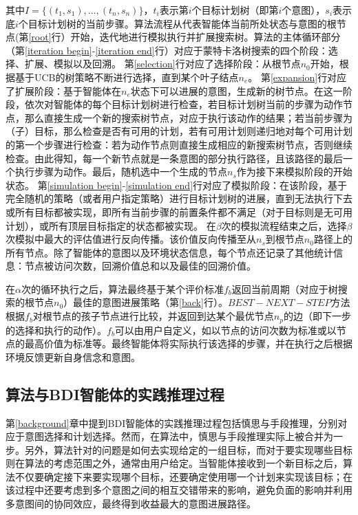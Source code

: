 其中$I=\{(t_1,s_1), \dots, (t_n, s_n)\}$，$t_i$表示第$i$个目标计划树（即第$i$个意图），$s_i$表示底$i$个目标计划树的当前步骤。算法流程从代表智能体当前所处状态与意图的根节点(第\ref{root}行）开始，迭代地进行模拟执行并扩展搜索树。算法的主体循环部分（第\ref{iteration begin}-\ref{iteration end}行）对应于蒙特卡洛树搜索的四个阶段：选择、扩展、模拟以及回溯。
第\ref{selection}行对应了选择阶段：从根节点$n_0$开始，根据基于UCB的树策略不断进行选择，直到某个叶子结点$n_e$。
第\ref{expansion}行对应了扩展阶段：基于智能体在$n_e$状态下可以进展的意图，生成新的树节点。在这一阶段，依次对智能体的每个目标计划树进行检查，若目标计划树当前的步骤为动作节点，那么直接生成一个新的搜索树节点，对应于执行该动作的结果；若当前步骤为（子）目标，那么检查是否有可用的计划，若有可用计划则递归地对每个可用计划的第一个步骤进行检查：若为动作节点则直接生成相应的新搜索树节点，否则继续检查。由此得知，每一个新节点就是一条意图的部分执行路径，且该路径的最后一个执行步骤为动作。最后，随机选中一个生成的节点$n_s$作为接下来模拟阶段的开始状态。
第\ref{simulation begin}-\ref{simulation end}行对应了模拟阶段：在该阶段，基于完全随机的策略（或者用户指定策略）进行目标计划树的进展，直到无法执行下去或所有目标都被实现，即所有当前步骤的前置条件都不满足（对于目标则是无可用计划），或所有顶层目标指定的状态都被实现。
在$\beta$次的模拟流程结束之后，选择$\beta$次模拟中最大的评估值进行反向传播。该价值反向传播至从$n_s$到根节点$n_0$路径上的所有节点。除了智能体的意图以及环境状态信息，每个节点还记录了其他统计信息：节点被访问次数，回溯价值总和以及最佳的回溯价值。

在$\alpha$次的循环执行之后，\SA 算法最终基于某个评价标准$f_b$返回当前周期（对应于树搜索的根节点$n_0$）最佳的意图进展策略（第\ref{back}行）。$BEST-NEXT-STEP$方法根据$f_b$对根节点的孩子节点进行比较，并返回到达某个最优节点$n_p$的边（即下一步的选择和执行的动作）。$f_b$可以由用户自定义，如以节点的访问次数为标准或以节点的最高价值为标准等。最终智能体将实际执行该选择的步骤，并在执行之后根据环境反馈更新自身信念和意图。

\subsection{\SA 算法与BDI智能体的实践推理过程}
第\ref{background}章中提到BDI智能体的实践推理过程包括慎思与手段推理，分别对应于意图选择和计划选择。然而，在\SA 算法中，慎思与手段推理实际上被合并为一步。另外，\SA 算法针对的问题是如何去实现给定的一组目标，而对于要实现哪些目标则在\SA 算法的考虑范围之外，通常由用户给定。当智能体接收到一个新目标之后，\SA 算法不仅要确定接下来要实现哪个目标，还要确定使用哪一个计划来实现该目标；在该过程中还要考虑到多个意图之间的相互交错带来的影响，避免负面的影响并利用多意图间的协同效应，最终得到收益最大的意图进展路径。


